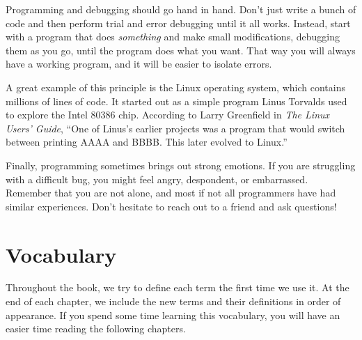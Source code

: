 \documentclass[12pt]{book}
\theoremstyle{exercise}
\begin{document}
Programming and debugging should go hand in hand.
Don't just write a bunch of code and then perform trial and error debugging until it all works.
Instead, start with a program that does {\em something} and make small modifications, debugging them as you go, until the program does what you want.
That way you will always have a working program, and it will be easier to isolate errors.


A great example of this principle is the Linux operating system, which contains millions of lines of code.
It started out as a simple program Linus Torvalds used to explore the Intel 80386 chip.
According to Larry Greenfield in {\it The Linux Users' Guide}, ``One of Linus's earlier projects was a program that would switch between printing AAAA and BBBB.
This later evolved to Linux.''


Finally, programming sometimes brings out strong emotions.
If you are struggling with a difficult bug, you might feel angry, despondent, or embarrassed.
Remember that you are not alone, and most if not all programmers have had similar experiences.
Don't hesitate to reach out to a friend and ask questions!


\section{Vocabulary}

Throughout the book, we try to define each term the first time we use it.
At the end of each chapter, we include the new terms and their definitions in order of appearance.
If you spend some time learning this vocabulary, you will have an easier time reading the following chapters.
\end{document}
